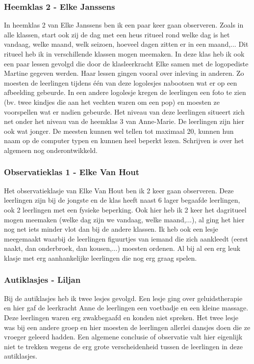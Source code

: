 \documentclass[a4paper,11pt]{article}
\theoremstyle{definition}
\begin{document}
\begin{itemize}
\begin{itemize}
\subsubsection{Heemklas 2 - Elke Janssens}
In heemklas 2 van Elke Janssens ben ik een paar keer gaan observeren. Zoals in 
alle klassen, start ook zij de dag met een heus ritueel rond welke dag is het 
vandaag, welke maand, welk seizoen, hoeveel dagen zitten er in een maand,... Dit 
ritueel heb ik in verschillende klassen mogen meemaken. In deze klas heb ik ook 
een paar lessen gevolgd die door de klasleerkracht Elke samen met de logopediste 
Martine gegeven werden. Haar lessen gingen vooral over inleving in anderen. Zo 
moesten de leerlingen tijdens één van deze logolesjes nabootsen wat er op een 
afbeelding gebeurde. In een andere logolesje kregen de leerlingen een foto te zien (bv. twee kindjes die aan het vechten waren om een pop) 
en moesten ze voorspellen wat er nadien gebeurde. Het niveau van deze leerlingen 
situeert zich net onder het niveau van de heemklas 3 van Anne-Marie. De 
leerlingen zijn hier ook wat jonger. De meesten kunnen wel tellen tot maximaal 
20, kunnen hun naam op de computer typen en kunnen heel beperkt lezen. Schrijven 
is over het algemeen nog onderontwikkeld.
\subsubsection{Observatieklas 1 - Elke Van Hout}
Het observatieklasje van Elke Van Hout ben ik 2 keer gaan observeren. Deze 
leerlingen zijn bij de jongste en de klas heeft naast 6 lager begaafde 
leerlingen, ook 2 leerlingen met een fysieke beperking. Ook hier heb ik 2 keer 
het dagritueel mogen meemaken (welke dag zijn we vandaag, welke maand,...), al 
ging het hier nog net iets minder vlot dan bij de andere klassen. Ik heb ook een 
lesje meegemaakt waarbij de leerlingen figuurtjes van iemand die zich aankleedt (eerst naakt, dan onderbroek, dan kousen,...) 
moesten ordenen. Al bij al een erg leuk klasje met erg aanhankelijke leerlingen 
die nog erg graag spelen.


\subsubsection{Autiklasjes - Liljan}\label{auti}
Bij de autiklasjes heb ik twee lesjes gevolgd. Een lesje ging over 
geluidstherapie en hier gaf de leerkracht Anne de leerlingen een voetbadje en 
een kleine massage. Deze leerlingen waren erg zwakbegaafd en konden niet 
spreken. Het twee lesje was bij een andere groep en hier moesten de leerlingen 
allerlei dansjes doen die ze vroeger geleerd hadden. Een algemene conclusie of 
observatie valt hier eigenlijk niet te trekken wegens de erg grote 
verscheidenheid tussen de leerlingen in deze autiklasjes. \\


\end{itemize}
\end{itemize}
\end{document}
